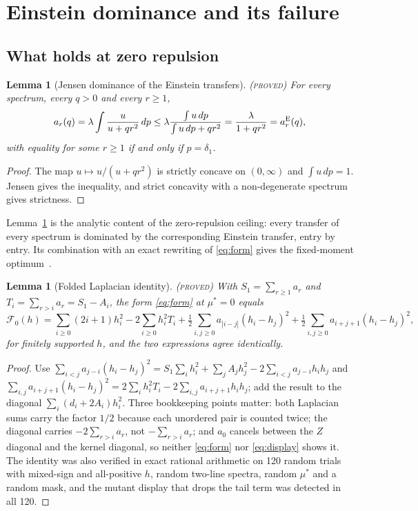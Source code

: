 \documentclass[11pt]{article}
\newcommand{\Fcal}{\mathcal F}
\newcommand{\muS}{\mu^{*}}
\newtheorem{lemma}[theorem]{Lemma}
\theoremstyle{definition}
\theoremstyle{remark}
\newcommand{\proved}{\textnormal{\textsc{(proved)}}}
\begin{document}
\section{Einstein dominance and its failure}\label{sec:dom}

\subsection{What holds at zero repulsion}

\begin{lemma}[Jensen dominance of the Einstein transfers]\label{lem:jensen}\proved
For every spectrum, every $q>0$ and every $r\ge1$,
\begin{equation}\label{eq:jensen}
a_r(q)=\lambda\int\frac{u}{u+qr^2}\,dp
\le\lambda\frac{\int u\,dp}{\int u\,dp+qr^2}=\frac{\lambda}{1+qr^2}=a_r^{\rm E}(q),
\end{equation}
with equality for some $r\ge1$ if and only if $p=\delta_1$.
\end{lemma}
\begin{proof}
The map $u\mapsto u/(u+qr^2)$ is strictly concave on $(0,\infty)$ and $\int u\,dp=1$.
Jensen gives the inequality, and strict concavity with a non-degenerate spectrum gives
strictness.
\end{proof}

Lemma~\ref{lem:jensen} is the analytic content of the zero-repulsion ceiling: every
transfer of every spectrum is dominated by the corresponding Einstein transfer, entry by
entry. Its combination with an exact rewriting of \eqref{eq:form} gives the fixed-moment
optimum~\cite{rens}.

\begin{lemma}[Folded Laplacian identity]\label{lem:laplace}\proved
With $S_1=\sum_{r\ge1}a_r$ and $T_i=\sum_{r>i}a_r=S_1-A_i$, the form \eqref{eq:form} at
$\muS=0$ equals
\begin{equation}\label{eq:display}
\Fcal_0(h)=\sum_{i\ge0}(2i+1)h_i^2-2\sum_{i\ge0}h_i^2T_i
+\tfrac12\sum_{i,j\ge0}a_{|i-j|}(h_i-h_j)^2
+\tfrac12\sum_{i,j\ge0}a_{i+j+1}(h_i-h_j)^2 ,
\end{equation}
for finitely supported $h$, and the two expressions agree identically.
\end{lemma}
\begin{proof}
Use $\sum_{i<j}a_{j-i}(h_i-h_j)^2=S_1\sum_ih_i^2+\sum_jA_jh_j^2-2\sum_{i<j}a_{j-i}h_ih_j$
and $\sum_{i,j}a_{i+j+1}(h_i-h_j)^2=2\sum_ih_i^2T_i-2\sum_{i,j}a_{i+j+1}h_ih_j$; add the
result to the diagonal $\sum_i(d_i+2A_i)h_i^2$. Three bookkeeping points matter: both
Laplacian sums carry the factor $1/2$ because each unordered pair is counted twice; the
diagonal carries $-2\sum_{r>i}a_r$, not $-\sum_{r>i}a_r$; and $a_0$ cancels between the
$Z$ diagonal and the kernel diagonal, so neither \eqref{eq:form} nor \eqref{eq:display}
shows it. The identity was also verified in exact rational arithmetic on 120 random
trials with mixed-sign and all-positive $h$, random two-line spectra, random $\muS$ and a
random mask, and the mutant display that drops the tail term was detected in all 120.
\end{proof}
\end{document}
